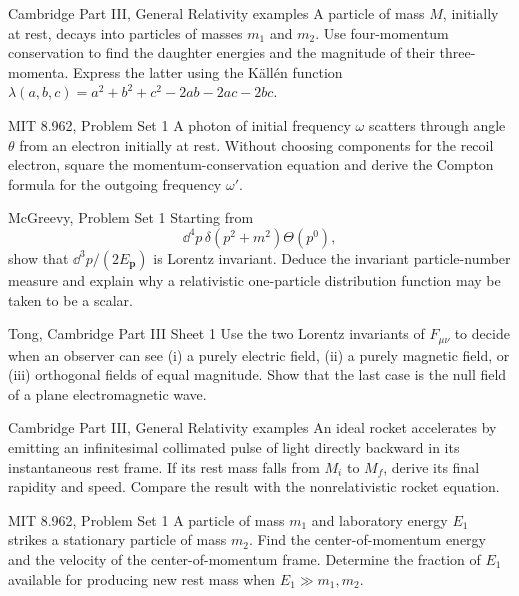 \begin{exercise}{Cambridge Part III, General Relativity examples}
A particle of mass \(M\), initially at rest, decays into particles of masses
\(m_1\) and \(m_2\).  Use four-momentum conservation to find the daughter
energies and the magnitude of their three-momenta.  Express the latter using
the K\"all\'en function
\(\lambda(a,b,c)=a^2+b^2+c^2-2ab-2ac-2bc\).
\end{exercise}

\begin{exercise}{MIT 8.962, Problem Set 1}
A photon of initial frequency \(\omega\) scatters through angle \(\theta\) from
an electron initially at rest.  Without choosing components for the recoil
electron, square the momentum-conservation equation and derive the Compton
formula for the outgoing frequency \(\omega'\).
\end{exercise}

\begin{exercise}{McGreevy, Problem Set 1}
Starting from
\[
\dd^4p\,\delta(p^2+m^2)\Theta(p^0),
\]
show that \(\dd^3p/(2E_{\bm p})\) is Lorentz invariant.  Deduce the invariant
particle-number measure and explain why a relativistic one-particle
distribution function may be taken to be a scalar.
\end{exercise}

\begin{exercise}{Tong, Cambridge Part III Sheet 1}
Use the two Lorentz invariants of \(F_{\mu\nu}\) to decide when an observer can
see (i) a purely electric field, (ii) a purely magnetic field, or (iii)
orthogonal fields of equal magnitude.  Show that the last case is the null
field of a plane electromagnetic wave.
\end{exercise}

\begin{exercise}{Cambridge Part III, General Relativity examples}
An ideal rocket accelerates by emitting an infinitesimal collimated pulse of
light directly backward in its instantaneous rest frame.  If its rest mass
falls from \(M_i\) to \(M_f\), derive its final rapidity and speed.  Compare
the result with the nonrelativistic rocket equation.
\end{exercise}

\begin{exercise}{MIT 8.962, Problem Set 1}
A particle of mass \(m_1\) and laboratory energy \(E_1\) strikes a stationary
particle of mass \(m_2\).  Find the center-of-momentum energy and the velocity
of the center-of-momentum frame.  Determine the fraction of \(E_1\) available
for producing new rest mass when \(E_1\gg m_1,m_2\).
\end{exercise}

